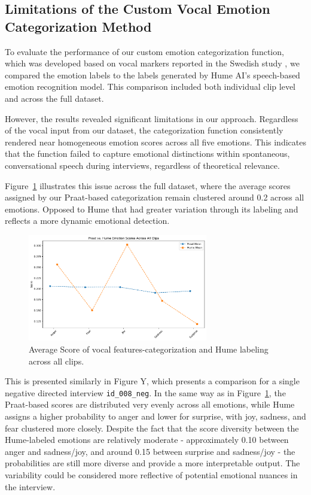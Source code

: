 \subsection{Limitations of the Custom Vocal Emotion Categorization Method}
To evaluate the performance of our custom emotion categorization function, which was developed based on vocal markers reported in the Swedish study \autocite{Ekberg2023}, we compared the emotion labels to the labels generated by Hume AI’s speech-based emotion recognition model. This comparison included both individual clip level and across the full dataset. 

However, the results revealed significant limitations in our approach. Regardless of the vocal input from our dataset, the categorization function consistently rendered near homogeneous emotion scores across all five emotions. This indicates that the function failed to capture emotional distinctions within spontaneous, conversational speech during interviews, regardless of theoretical relevance. 

Figure~\ref{fig:scatter_hume_praat} illustrates this issue across the full dataset, where the average scores assigned by our Praat-based categorization remain clustered around 0.2 across all emotions. Opposed to Hume that had greater variation through its labeling and reflects a more dynamic emotional detection.

\begin{figure}[H]
    \centering
    \includegraphics[width=0.7\textwidth]{png/results/rq1/praat_hume_all_clips_scatter.pdf}
    \caption{Average Score of vocal features-categorization and Hume labeling across all clips.}
    \label{fig:scatter_hume_praat}
\end{figure}

This is presented similarly in Figure Y, which presents a comparison for a single negative directed interview \texttt{id\_008\_neg}. In the same way as in Figure~\ref{fig:scatter_hume_praat}, the Praat-based scores are distributed very evenly across all emotions, while Hume assigns a higher probability to anger and lower for surprise,
with joy, sadness, and fear clustered more closely. Despite the fact that the score diversity between the Hume-labeled emotions are relatively moderate - approximately 0.10 between anger and sadness/joy, and around 0.15 between surprise and sadness/joy - the probabilities are still more diverse and provide a more interpretable output. The variability could be considered more reflective of potential emotional nuances in the interview. 

